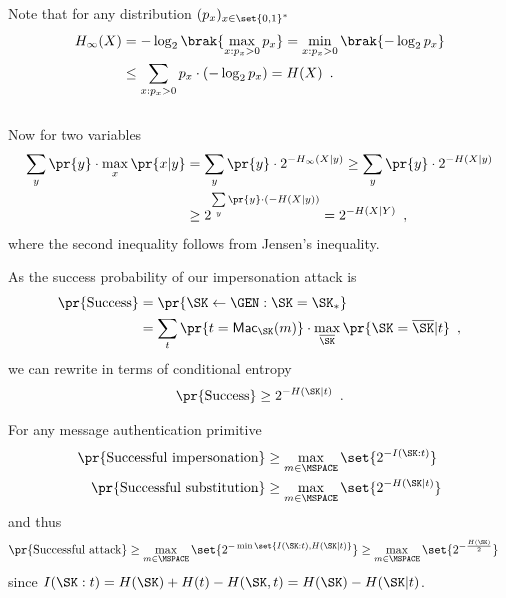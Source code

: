 \documentclass[landscape,footrule]{foils}
\begin{document}

Note that for any distribution $(p_x)_{x\in\set{0,1}^*}$\vspace*{-0.0ex}
\begin{align*}
  H_{\infty}(X)&=-\log_2\brak{\max_{x:p_x>0} p_x}=\min_{x:p_x>0}\brak{-\log_2 p_x}\\
             &\leq \sum_{x:p_x>0} p_x\cdot (-\log_2 p_x)=H(X)\enspace.
\end{align*}\ \vspace*{-2.0ex}\\
Now for two variables\vspace*{-0.0ex}
\begin{align*}
  \sum_{y}\pr{y}\cdot\max_x\pr{x|y}%
  &=\sum_{y} \pr{y}\cdot2^{-H_\infty(X|y)}
  \geq\sum_{y} \pr{y}\cdot2^{-H(X|y)}\\
  &\geq 2^{\sum\limits_y\pr{y}\cdot(-H(X|y))}=2^{-H(X|Y)}\enspace,
\end{align*}
where the second inequality follows from Jensen's inequality.




As the success probability of our impersonation attack is 
\begin{align*}
  \pr{\mathrm{Success}}&=\pr{\SK\gets\GEN:\SK=\SK_*}\\
  &=\sum_{t}\pr{t=\MAC_\SK(m)}\cdot\max_{\overline{\SK}}\pr{\SK=\overline{\SK}|t}\enspace,
\end{align*}
we can rewrite in terms of conditional entropy
\begin{align*}
   \pr{\mathrm{Success}}\geq 2^{-H(\SK|t)}\enspace.
\end{align*}


For any message authentication primitive 
\begin{align*}
  \pr{\text{Successful impersonation}}&\geq \max_{m\in\MSPACE} \set{2^{-I(\SK:t)}}\\
  \pr{\text{Successful substitution}}&\geq \max_{m\in\MSPACE} \set{2^{-H(\SK|t)}}
\end{align*}
and thus
\begin{align*}
  \pr{\text{Successful attack}}&\geq \max_{m\in\MSPACE}\set{2^{-\min\set{I(\SK:t),H(\SK|t)}}}
  \geq \max_{m\in\MSPACE}\set{2^{-\frac{H(\SK)}{2}}}
\end{align*}
since $I(\SK:t)=H(\SK)+H(t)-H(\SK,t)=H(\SK)-H(\SK|t)$.
\end{document}

